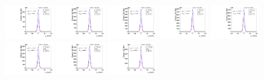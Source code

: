 \begin{figure}[htb]
\ContinuedFloat
\centering
\includegraphics[width=0.19\textwidth]{plots/Appendix_Recoil_Fits/WmpMC_PF_5TeV_2G/pfu2fit_0.pdf}
\includegraphics[width=0.19\textwidth]{plots/Appendix_Recoil_Fits/WmpMC_PF_5TeV_2G/pfu2fit_1.pdf}
\includegraphics[width=0.19\textwidth]{plots/Appendix_Recoil_Fits/WmpMC_PF_5TeV_2G/pfu2fit_2.pdf}
\includegraphics[width=0.19\textwidth]{plots/Appendix_Recoil_Fits/WmpMC_PF_5TeV_2G/pfu2fit_3.pdf}
\includegraphics[width=0.19\textwidth]{plots/Appendix_Recoil_Fits/WmpMC_PF_5TeV_2G/pfu2fit_4.pdf}
\includegraphics[width=0.19\textwidth]{plots/Appendix_Recoil_Fits/WmpMC_PF_5TeV_2G/pfu2fit_5.pdf}
\includegraphics[width=0.19\textwidth]{plots/Appendix_Recoil_Fits/WmpMC_PF_5TeV_2G/pfu2fit_6.pdf}
\includegraphics[width=0.19\textwidth]{plots/Appendix_Recoil_Fits/WmpMC_PF_5TeV_2G/pfu2fit_7.pdf}

\end{figure}
